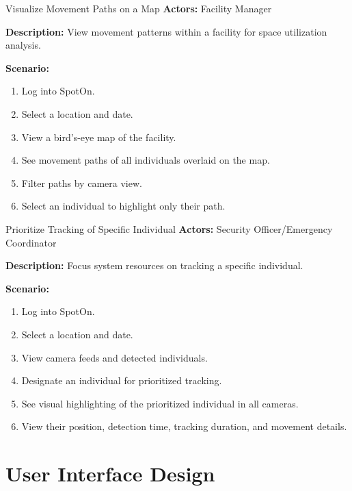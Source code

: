 \begin{usecase}{Visualize Movement Paths on a Map}
    \textbf{Actors:} Facility Manager
    
    \textbf{Description:} View movement patterns within a facility for space utilization analysis.
    
    \textbf{Scenario:}
    \begin{enumerate}[leftmargin=80pt]
        \item Log into SpotOn.
        \item Select a location and date.
        \item View a bird's-eye map of the facility.
        \item See movement paths of all individuals overlaid on the map.
        \item Filter paths by camera view.
        \item Select an individual to highlight only their path.
    \end{enumerate}
\end{usecase}

\begin{usecase}{Prioritize Tracking of Specific Individual}
    \textbf{Actors:} Security Officer/Emergency Coordinator
    
    \textbf{Description:} Focus system resources on tracking a specific individual.
    
    \textbf{Scenario:}
    \begin{enumerate}[leftmargin=80pt]
        \item Log into SpotOn.
        \item Select a location and date.
        \item View camera feeds and detected individuals.
        \item Designate an individual for prioritized tracking.
        \item See visual highlighting of the prioritized individual in all cameras.
        \item View their position, detection time, tracking duration, and movement details.
    \end{enumerate}
\end{usecase}


\section{User Interface Design}
\label{section:user-interface-design}

